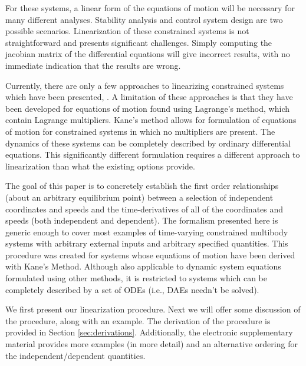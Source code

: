 \documentclass[smallcondensed]{svjour3}                     %
\begin{document}
For these systems, a linear form of the equations of motion will be necessary
for many different analyses.  Stability analysis and control system design are
two possible scenarios.  Linearization of these constrained systems is not
straightforward and presents significant challenges. Simply computing the
jacobian matrix of the differential equations will give incorrect results, with
no immediate indication that the results are wrong.

Currently, there are only a few approaches to linearizing constrained systems
which have been presented\cite{Kang2003}, \cite{Negrut2006}. A limitation of these approaches is
that they have been developed for equations of motion found using Lagrange's
method, which contain Lagrange multipliers. Kane's method \cite{Kane1985}
allows for formulation of equations of motion for constrained systems in which
no multipliers are present. The dynamics of these systems can be completely
described by ordinary differential equations. This significantly different
formulation requires a different approach to linearization than what the
existing options provide.

The goal of this paper is to concretely establish the first order
relationships (about an arbitrary equilibrium point) between a selection of
independent coordinates and speeds and the time-derivatives of all of the
coordinates and speeds (both independent and dependent). The formalism
presented here is generic enough to cover most examples of time-varying
constrained multibody systems with arbitrary external inputs and arbitrary
specified quantities.  This procedure was created for systems whose equations
of motion have been derived with Kane's Method. Although also applicable to
dynamic system equations formulated using other methods, it is restricted to
systems which can be completely described by a set of ODEs (i.e., DAEs needn't
be solved).

We first present our linearization procedure. Next we will offer some
discussion of the procedure, along with an example. The derivation of the
procedure is provided in Section \ref{sec:derivations}. Additionally, the electronic
supplementary material provides more examples (in more detail) and an
alternative ordering for the independent/dependent quantities.
\end{document}

